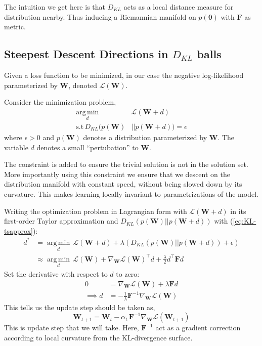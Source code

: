 \documentclass[10pt,twocolumn,letterpaper]{article}
\newcommand{\vect}[1]{\boldsymbol{\mathbf{#1}}}
\DeclareMathOperator*{\argmin}{arg\,min}
\begin{document}
The intuition we get here is that \(D_{KL}\) acts as a local distance measure for distribution nearby.
Thus inducing a Riemannian manifold on \(p(\vect{\theta})\) with \(\vect{F}\) as metric.

\subsection{Steepest Descent Directions in \(D_{KL}\) balls}
Given a loss function to be minimized, in our case the negative log-likelihood parameterized by \(\vect{W}\), denoted \(\mathcal{L}(\vect{W})\).

Consider the minimization problem,
\begin{align*}
\underset{d}{\argmin} \, &\mathcal{L}(\vect{W} + d) \\
\mbox{s.t} \, D_{KL}(p(\vect{W}) &|| p(\vect{W}+d)) = \epsilon
\end{align*}
where \(\epsilon > 0\) and \(p(\vect{W})\) denotes a distribution parameterized by \(\vect{W}\). The variable \(d\) denotes a small ``pertubation'' to \(\vect{W}\). 

The constraint is added to ensure the trivial solution is not in the solution set. 
More importantly using this constraint we ensure that we descent on the distribution manifold with constant speed, without being slowed down by its curvature. 
This makes learning locally invariant to parametrizations of the model.

Writing the optimization problem in Lagrangian form with \(\mathcal{L}(\vect{W} + d)\) in its first-order Taylor approximation and \(D_{KL}(p(\vect{W}) || p(\vect{W}+d))\) with (\ref{eq:KL-tsapprox}):
\begin{align*}
    d^{*} &= \underset{d}{\argmin} \, \mathcal{L}(\vect{W} + d) + \lambda  (D_{KL}(p(\vect{W}) || p(\vect{W}+d)) + \epsilon) \\
    &\approx \underset{d}{\argmin} \, \mathcal{L}(\vect{W}) + \nabla_{\vect{W}} \mathcal{L}(\vect{W})^{\intercal}d + \frac{\lambda}{2}d^{\intercal}\vect{F}d
\end{align*}
Set the derivative with respect to \(d\) to zero:
\begin{align*}
    0 &= \nabla_{\vect{W}} \mathcal{L}(\vect{W}) + \lambda \vect{F}d \\
    \implies d &= -\frac{1}{\lambda} \vect{F}^{-1}\nabla_{\vect{W}} \mathcal{L}(\vect{W})
\end{align*}
This tells us the update step should be taken as,
\begin{equation}
    \vect{\vect{W}}_{t+1} = \vect{\vect{W}}_{t} - \alpha_t \, \vect{F}^{-1} \nabla_{\vect{W}} \mathcal{L}(\vect{W}_{t+1})
\end{equation}
This is update step that we will take. Here, \(\vect{F}^{-1}\) act as a gradient correction according to local curvature from the KL-divergence surface.
\end{document}
